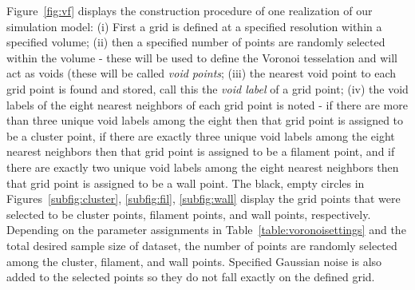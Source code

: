 \documentclass[12pt]{article}
\newcommand{\figref}[1]{Figure~\ref{#1}}
\begin{document}
\figref{fig:vf} displays the construction procedure of one realization of our simulation model:  (i) First a grid is defined at a specified resolution within a specified volume; (ii) then a specified number of points are randomly selected within the volume - these will be used to define the Voronoi tesselation and will act as voids (these will be called \emph{void points}; (iii) the nearest void point to each grid point is found and stored, call this the \emph{void label} of a grid point; (iv) the void labels of the eight nearest neighbors of each grid point is noted - if there are more than three unique void labels among the eight then that grid point is assigned to be a cluster point, if there are exactly three unique void labels among the eight nearest neighbors then that grid point is assigned to be a filament point, and if there are exactly two unique void labels among the eight nearest neighbors then that grid point is assigned to be a wall point. The black, empty circles in Figures~\ref{subfig:cluster}, \ref{subfig:fil}, \ref{subfig:wall} display the grid points that were selected to be cluster points, filament points, and wall points, respectively.  Depending on the parameter assignments in Table~\ref{table:voronoisettings} and the total desired sample size of dataset, the number of points are randomly selected among the cluster, filament, and wall points.  Specified Gaussian noise is also added to the selected points so they do not fall exactly on the defined grid.
\end{document}

